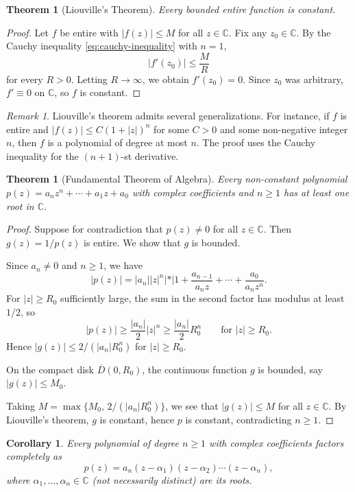 \documentclass[12pt,a4paper,openany]{book}
\theoremstyle{definition}
\theoremstyle{plain}
\newtheorem{theorem}[definition]{Theorem}
\newtheorem{corollary}[definition]{Corollary}
\theoremstyle{remark}
\newtheorem{remark}[definition]{Remark}
\newcommand{\C}{\mathbb{C}}
\newcommand{\abs}[1]{\left|#1\right|}
\begin{document}
\begin{theorem}[Liouville's Theorem]\label{thm:liouville}
Every bounded entire function is constant.
\end{theorem}

\begin{proof}
Let $f$ be entire with $\abs{f(z)}\le M$ for all $z\in\C$. Fix any $z_0\in\C$.
By the Cauchy inequality \eqref{eq:cauchy-inequality} with $n=1$,
\[
  \abs{f'(z_0)} \le \frac{M}{R}
\]
for every $R>0$. Letting $R\to\infty$, we obtain $f'(z_0)=0$. Since $z_0$ was
arbitrary, $f'\equiv 0$ on $\C$, so $f$ is constant.
\end{proof}

\begin{remark}\label{rem:liouville-generalizations}
Liouville's theorem admits several generalizations. For instance, if $f$ is
entire and $\abs{f(z)}\le C(1+\abs{z})^n$ for some $C>0$ and some non-negative
integer $n$, then $f$ is a polynomial of degree at most $n$. The proof uses
the Cauchy inequality for the $(n+1)$-st derivative.
\end{remark}

\begin{theorem}[Fundamental Theorem of Algebra]\label{thm:fta}
Every non-constant polynomial $p(z)=a_nz^n+\cdots+a_1z+a_0$ with complex
coefficients and $n\ge 1$ has at least one root in $\C$.
\end{theorem}

\begin{proof}
Suppose for contradiction that $p(z)\ne 0$ for all $z\in\C$. Then $g(z)=1/p(z)$
is entire. We show that $g$ is bounded.

Since $a_n\ne 0$ and $n\ge 1$, we have
\[
  \abs{p(z)} = \abs{a_n}\abs{z}^n
  \abs*{1 + \frac{a_{n-1}}{a_n z}+\cdots+\frac{a_0}{a_n z^n}}.
\]
For $\abs{z}\ge R_0$ sufficiently large, the sum in the second factor has modulus
at least $1/2$, so
\[
  \abs{p(z)} \ge \frac{\abs{a_n}}{2}\abs{z}^n \ge \frac{\abs{a_n}}{2}R_0^n
  \qquad\text{for } \abs{z}\ge R_0.
\]
Hence $\abs{g(z)}\le 2/(\abs{a_n}R_0^n)$ for $\abs{z}\ge R_0$.

On the compact disk $\overline{D}(0,R_0)$, the continuous function $g$ is
bounded, say $\abs{g(z)}\le M_0$.

Taking $M=\max\{M_0, \, 2/(\abs{a_n}R_0^n)\}$, we see that $\abs{g(z)}\le M$
for all $z\in\C$. By Liouville's theorem, $g$ is constant, hence $p$ is
constant, contradicting $n\ge 1$.
\end{proof}

\begin{corollary}\label{cor:fta-factors}
Every polynomial of degree $n\ge 1$ with complex coefficients factors completely
as
\[
  p(z) = a_n(z-\alpha_1)(z-\alpha_2)\cdots(z-\alpha_n),
\]
where $\alpha_1,\ldots,\alpha_n\in\C$ (not necessarily distinct) are its roots.
\end{corollary}
\end{document}
